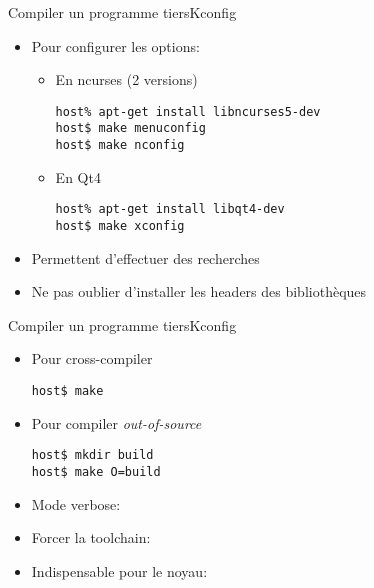 \begin{frame}[fragile=singleslide]{Compiler un programme tiers}{Kconfig}
  \begin{itemize}
  \item Pour configurer les options:
    \begin{itemize}
    \item En ncurses (2 versions)
\begin{lstlisting}
host% apt-get install libncurses5-dev
host$ make menuconfig
host$ make nconfig
\end{lstlisting} %
    \item En Qt4
\begin{lstlisting}
host% apt-get install libqt4-dev
host$ make xconfig
\end{lstlisting} %
    \end{itemize}
  \item Permettent d'effectuer des recherches
  \item Ne pas oublier d'installer les headers des bibliothèques
  \end{itemize}
\end{frame}

\begin{frame}[fragile=singleslide]{Compiler un programme tiers}{Kconfig}
  \begin{itemize}
  \item Pour cross-compiler
\begin{lstlisting}
host$ make
\end{lstlisting} %
  \item Pour compiler \emph{out-of-source}
\begin{lstlisting}
host$ mkdir build
host$ make O=build
\end{lstlisting} %
  \item Mode verbose: 
  \item Forcer la toolchain: 
  \item Indispensable pour le noyau: 
  \end{itemize}
\end{frame}

